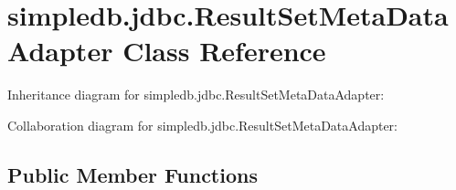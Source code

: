 \hypertarget{classsimpledb_1_1jdbc_1_1ResultSetMetaDataAdapter}{}\section{simpledb.\+jdbc.\+Result\+Set\+Meta\+Data\+Adapter Class Reference}
\label{classsimpledb_1_1jdbc_1_1ResultSetMetaDataAdapter}


Inheritance diagram for simpledb.\+jdbc.\+Result\+Set\+Meta\+Data\+Adapter\+:


Collaboration diagram for simpledb.\+jdbc.\+Result\+Set\+Meta\+Data\+Adapter\+:
\subsection*{Public Member Functions}
